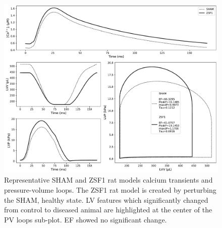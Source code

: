 \begin{figure}[!ht]
    \myfloatalign
    \includegraphics[width=\textwidth]{figures/chapter07/w1_resulting_bestfit_ca_and_pvloop.pdf}
    \caption{Representative SHAM and ZSF1 rat models calcium transients and pressure-volume loops. The ZSF1 rat model is created by perturbing the SHAM, healthy state. LV features which significantly changed from control to diseased animal are highlighted at the center of the PV loops sub-plot. EF showed no significant change.}
    \label{fig:shamandzsf1ratmodels}
\end{figure}

